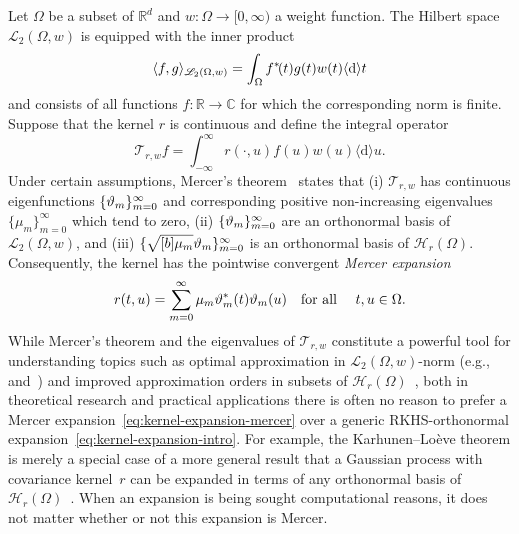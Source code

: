 \documentclass{article}
\newcommand{\cdummy}{\cdot}
\newcommand{\mathd}{\mathrm{d}}
\newcommand{\tmcolor}[2]{{\color{#1}{#2}}}
\newcommand{\tmem}[1]{{\em #1\/}}
\newcommand{\R}{\mathbb{R}}
\newcommand{\dif}{ \langle \mathd \rangle }
\newcommand{\C}{\mathbb{C}}
\newcommand{\rev}[1]{\tmcolor{black}{#1}}
\begin{document}
Let $\Omega$ be a subset of $\R^d$ and $w : \Omega \to [0, \infty)$ a weight
function. The Hilbert space $\mathscr{L}_2 (\Omega, w)$ is equipped with the
inner product
\[ \langle f, g \rangle_{\mathscr{L}_2 (\Omega, w)} = \int_{\Omega} f^{\ast}
   \hspace{-0.17em} (t) g (t) w (t) \dif t \]
and consists of all functions $f : \R \to \C$ for which the corresponding norm
is finite. Suppose that the kernel $r$ is continuous and define the integral
operator
\begin{equation}
  \label{eq:mercer-integral-operator} \mathcal{T}_{r, w} f = \int_{-
  \infty}^{\infty} r (\cdummy, u) f (u) w (u) \dif u.
\end{equation}
Under certain assumptions, Mercer's theorem~{\cite{SteinwartScovel2012}}
states that (i) $\mathcal{T}_{r, w}$ has continuous eigenfunctions $\{
\rev{\vartheta}_m \}_{m = 0}^{\infty}$ and corresponding positive
non-increasing eigenvalues $\{\mu_m \}_{m = 0}^{\infty}$ which tend to zero,
(ii) $\{ \rev{\vartheta}_m \}_{m = 0}^{\infty}$ are an orthonormal basis of
$\mathscr{L}_2 (\Omega, w)$, and (iii) $\{ \sqrt{\smash{[} b] \mu_m}
\rev{\vartheta}_m \}_{m = 0}^{\infty}$ is an orthonormal basis of
$\mathscr{H}_r (\Omega)$. Consequently, the kernel has the pointwise
convergent {\tmem{Mercer expansion}}
\begin{equation}
  \label{eq:kernel-expansion-mercer} r (t, u) = \sum_{m = 0}^{\infty} \mu_m
  \rev{\vartheta}_m^{\ast} (t) \rev{\vartheta}_m (u)  \quad \text{for all }
  \quad t, u \in \Omega .
\end{equation}
While Mercer's theorem and the eigenvalues of $\mathcal{T}_{r, w}$ constitute
a powerful tool for understanding topics such as optimal approximation in
$\mathscr{L}_2 (\Omega, w)$-norm
(e.g.,~{\cite[Corollary~4.12]{NovakWozniakowski2008}}
and~{\cite[Section~2.4]{FasshauerHickernell2012}}) and improved approximation
orders in subsets of $\mathscr{H}_r
(\Omega)$~{\cite[Section~11.5]{Wendland2005}}, both in theoretical research
and practical applications there is often no reason to prefer a Mercer
expansion~\eqref{eq:kernel-expansion-mercer} over a generic RKHS-orthonormal
expansion~\eqref{eq:kernel-expansion-intro}. For example, the
Karhunen--Lo{\`e}ve theorem is merely a special case of a more general result
that a Gaussian process with covariance kernel~$r$ can be expanded in terms of
any orthonormal basis of $\mathscr{H}_r
(\Omega)$~{\cite[Chapter~III]{Adler1990}}. When an expansion is being sought
{\rev{solely for}} computational reasons, it does not matter whether or not
this expansion is Mercer.
\end{document}
